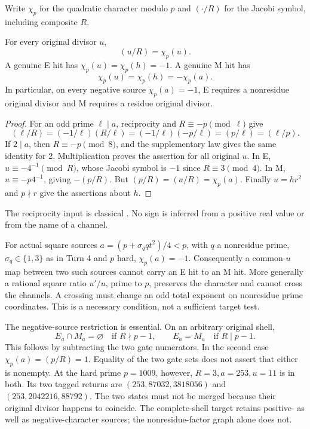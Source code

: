 Write $\chi_p$ for the quadratic character modulo $p$ and $(\cdot/R)$ for the
Jacobi symbol, including composite $R$.
\begin{theorem}\label{thm:sign}
For every original divisor $u$,
\[
 (u/R)=\chi_p(u).
\]
A genuine E hit has $\chi_p(u)=\chi_p(h)=-1$. A genuine M hit has
\[
 \chi_p(u)=\chi_p(h)=-\chi_p(a).                            \tag{4}
\]
In particular, on every negative source $\chi_p(a)=-1$, E requires a nonresidue
original divisor and M requires a residue original divisor.
\end{theorem}
\begin{proof}
For an odd prime $\ell\mid a$, reciprocity and $R\equiv-p\pmod\ell$ give
\[
 (\ell/R)=(-1/\ell)(R/\ell)=(-1/\ell)(-p/\ell)
 =(p/\ell)=(\ell/p).
\]
If $2\mid a$, then $R\equiv-p\pmod8$, and the supplementary law gives the same
identity for 2. Multiplication proves the assertion for all original $u$.
In E, $u\equiv-4^{-1}\pmod R$, whose Jacobi symbol is $-1$ since $R\equiv3\pmod4$.
In M, $u\equiv-p4^{-1}$, giving $-(p/R)$. But $(p/R)=(a/R)=\chi_p(a)$.
Finally $u=hr^2$ and $p\nmid r$ give the assertions about $h$.
\end{proof}
The reciprocity input is classical \cite[\S6.4]{Hatcher}. No sign is inferred
from a positive real value or from the name of a channel.

For actual square sources $a=(p+\sigma_q qt^2)/4<p$, with $q$ a nonresidue
prime, $\sigma_q\in\{1,3\}$ as in Turn 4 and $p$ hard, $\chi_p(a)=-1$.
Consequently a common-$u$ map between two such sources cannot carry an E hit to an
M hit. More generally a rational square ratio $u'/u$, prime to $p$, preserves the
character and cannot cross the channels. A crossing must change an odd total
exponent on nonresidue prime coordinates. This is a necessary condition, not a
sufficient target test.

The negative-source restriction is essential. On an arbitrary original shell,
\[
 E_a\cap M_a=\varnothing\quad\text{if }R\nmid p-1,
 \qquad E_a=M_a\quad\text{if }R\mid p-1.                  \tag{4a}
\]
This follows by subtracting the two gate numerators. In the second case
$\chi_p(a)=(p/R)=1$. Equality of the two gate sets does not assert that either
is nonempty. At the hard prime $p=1009$, however, $R=3,a=253,u=11$ is in both.
Its two tagged returns are $(253,87032,3818056)$ and
$(253,2042216,88792)$. The two states must not be merged because their original
divisor happens to coincide. The complete-shell target retains positive- as
well as negative-character sources; the nonresidue-factor graph alone does not.

